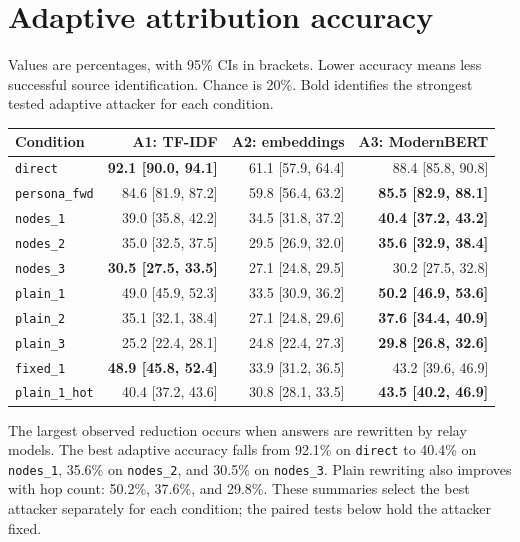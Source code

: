 \documentclass[11pt]{article}
\newcommand{\cond}[1]{\texttt{#1}}
\begin{document}
\section{Adaptive attribution accuracy}
Values are percentages, with 95\% CIs in brackets. Lower accuracy means less
successful source identification. Chance is 20\%. Bold identifies the
strongest tested adaptive attacker for each condition.
\begin{center}
\small
\begin{tabular}{lrrr}
\toprule
Condition & A1: TF-IDF & A2: embeddings & A3: ModernBERT \\
\midrule
\texttt{direct} & \textbf{92.1 [90.0, 94.1]} & 61.1 [57.9, 64.4] & 88.4 [85.8, 90.8] \\
\texttt{persona\_fwd} & 84.6 [81.9, 87.2] & 59.8 [56.4, 63.2] & \textbf{85.5 [82.9, 88.1]} \\
\texttt{nodes\_1} & 39.0 [35.8, 42.2] & 34.5 [31.8, 37.2] & \textbf{40.4 [37.2, 43.2]} \\
\texttt{nodes\_2} & 35.0 [32.5, 37.5] & 29.5 [26.9, 32.0] & \textbf{35.6 [32.9, 38.4]} \\
\texttt{nodes\_3} & \textbf{30.5 [27.5, 33.5]} & 27.1 [24.8, 29.5] & 30.2 [27.5, 32.8] \\
\texttt{plain\_1} & 49.0 [45.9, 52.3] & 33.5 [30.9, 36.2] & \textbf{50.2 [46.9, 53.6]} \\
\texttt{plain\_2} & 35.1 [32.1, 38.4] & 27.1 [24.8, 29.6] & \textbf{37.6 [34.4, 40.9]} \\
\texttt{plain\_3} & 25.2 [22.4, 28.1] & 24.8 [22.4, 27.3] & \textbf{29.8 [26.8, 32.6]} \\
\texttt{fixed\_1} & \textbf{48.9 [45.8, 52.4]} & 33.9 [31.2, 36.5] & 43.2 [39.6, 46.9] \\
\texttt{plain\_1\_hot} & 40.4 [37.2, 43.6] & 30.8 [28.1, 33.5] & \textbf{43.5 [40.2, 46.9]} \\
\bottomrule
\end{tabular}
\end{center}

The largest observed reduction occurs when answers are rewritten by relay
models. The best adaptive accuracy falls from 92.1\% on \cond{direct} to
40.4\% on \cond{nodes\_1}, 35.6\% on \cond{nodes\_2}, and 30.5\% on
\cond{nodes\_3}. Plain rewriting also improves with hop count: 50.2\%,
37.6\%, and 29.8\%. These summaries select the best attacker separately for
each condition; the paired tests below hold the attacker fixed.

\clearpage
\end{document}
